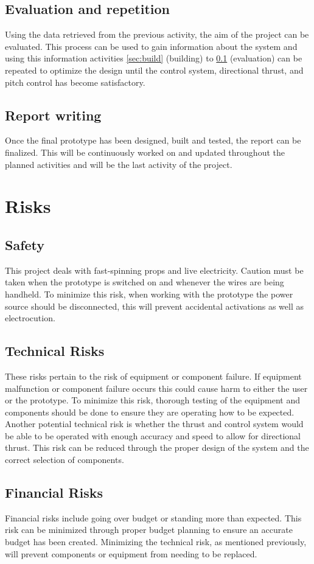     \subsection{Evaluation and repetition}\label{sec:Evaluation}
        Using the data retrieved from the previous activity, the aim of the project can be evaluated. This process can be used to gain information about the system and using this information activities \ref{sec:build} (building) to \ref*{sec:Evaluation} (evaluation) can be repeated to optimize the design until the control system, directional thrust, and pitch control has become satisfactory.
    \subsection{Report writing}
        Once the final prototype has been designed, built and tested, the report can be finalized. This will be continuously worked on and updated throughout the planned activities and will be the last activity of the project.  
    \section{Risks}
        \subsection{Safety}
            This project deals with fast-spinning props and live electricity. Caution must be taken when the prototype is switched on and whenever the wires are being handheld. To minimize this risk, when working with the prototype the power source should be disconnected, this will prevent accidental activations as well as electrocution.
        \subsection{Technical Risks}
            These risks pertain to the risk of equipment or component failure. If equipment malfunction or component failure occurs this could cause harm to either the user or the prototype. To minimize this risk, thorough testing of the equipment and components should be done to ensure they are operating how to be expected. Another potential technical risk is whether the thrust and control system would be able to be operated with enough accuracy and speed to allow for directional thrust. This risk can be reduced through the proper design of the system and the correct selection of components. 
        \subsection{Financial Risks}
            Financial risks include going over budget or standing more than expected. This risk can be minimized through proper budget planning to ensure an accurate budget has been created. Minimizing the technical risk, as mentioned previously, will prevent components or equipment from needing to be replaced.\\

